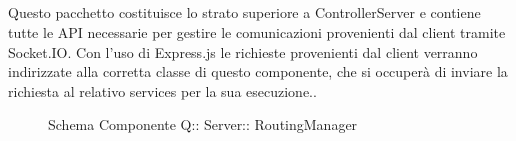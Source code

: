\subsection{}
Questo pacchetto costituisce lo strato superiore a ControllerServer e contiene tutte le API necessarie per gestire le comunicazioni provenienti dal client tramite Socket.IO. 
Con l'uso di Express.js le richieste provenienti dal client verranno indirizzate alla corretta classe di questo componente, che si occuperà di inviare la richiesta al relativo services per la sua esecuzione..
\begin{figure}[H]
\centering
\noindent{}
\caption[Schema Componente Quizzipedia::Server::RoutingManager]{Schema Componente Q:: Server:: RoutingManager}
\end{figure}
